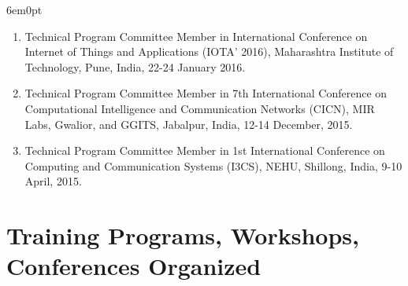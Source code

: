 \documentclass[11pt,a4paper]{moderncv}
\begin{document}
\begin{adjustwidth}{6em}{0pt}
\begin{enumerate}
		\item Technical Program Committee Member in International Conference on Internet of Things and Applications (IOTA' 2016), Maharashtra Institute of Technology, Pune, India, 22-24 January 2016.
		
		\item Technical Program Committee Member in 7th International Conference on Computational Intelligence and Communication Networks (CICN), MIR Labs, Gwalior, and GGITS, Jabalpur, India, 12-14 December, 2015.
		
		\item Technical Program Committee Member in 1st International Conference on Computing and Communication Systems (I3CS), NEHU, Shillong, India, 9-10 April, 2015.
		
		
		
	\end{enumerate}
\end{adjustwidth}









\section{\textbf{Training Programs, Workshops, Conferences Organized}}
\end{document}
